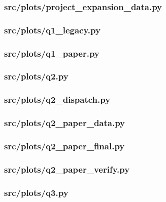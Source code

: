 \documentclass[zihao=-4,a4paper,UTF8,fontset=none]{ctexart}
\begin{document}
\subsubsection*{src/plots/project\_expansion\_data.py}


\subsubsection*{src/plots/q1\_legacy.py}


\subsubsection*{src/plots/q1\_paper.py}


\subsubsection*{src/plots/q2.py}


\subsubsection*{src/plots/q2\_dispatch.py}


\subsubsection*{src/plots/q2\_paper\_data.py}


\subsubsection*{src/plots/q2\_paper\_final.py}


\subsubsection*{src/plots/q2\_paper\_verify.py}


\subsubsection*{src/plots/q3.py}

\end{document}
